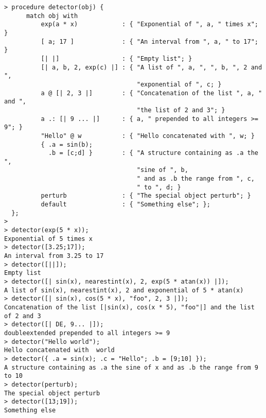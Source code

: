 \begin{center}\begin{minipage}{15cm}\begin{Verbatim}[frame=single]
> procedure detector(obj) {
      match obj with 
          exp(a * x)            : { "Exponential of ", a, " times x"; }
          [ a; 17 ]             : { "An interval from ", a, " to 17"; }
          [| |]                 : { "Empty list"; }
          [| a, b, 2, exp(c) |] : { "A list of ", a, ", ", b, ", 2 and ",
                                    "exponential of ", c; }
          a @ [| 2, 3 |]        : { "Concatenation of the list ", a, " and ",
                                    "the list of 2 and 3"; }
          a .: [| 9 ... |]      : { a, " prepended to all integers >= 9"; }
          "Hello" @ w           : { "Hello concatenated with ", w; }
          { .a = sin(b); 
            .b = [c;d] }        : { "A structure containing as .a the ",
                                    "sine of ", b,
                                    " and as .b the range from ", c, 
                                    " to ", d; }
          perturb               : { "The special object perturb"; }
          default               : { "Something else"; };
  };
> 
> detector(exp(5 * x));
Exponential of 5 times x
> detector([3.25;17]);
An interval from 3.25 to 17
> detector([||]);
Empty list
> detector([| sin(x), nearestint(x), 2, exp(5 * atan(x)) |]);
A list of sin(x), nearestint(x), 2 and exponential of 5 * atan(x)
> detector([| sin(x), cos(5 * x), "foo", 2, 3 |]);
Concatenation of the list [|sin(x), cos(x * 5), "foo"|] and the list of 2 and 3
> detector([| DE, 9... |]);
doubleextended prepended to all integers >= 9
> detector("Hello world");
Hello concatenated with  world
> detector({ .a = sin(x); .c = "Hello"; .b = [9;10] });
A structure containing as .a the sine of x and as .b the range from 9 to 10
> detector(perturb);
The special object perturb
> detector([13;19]);
Something else
\end{Verbatim}
\end{minipage}\end{center}
